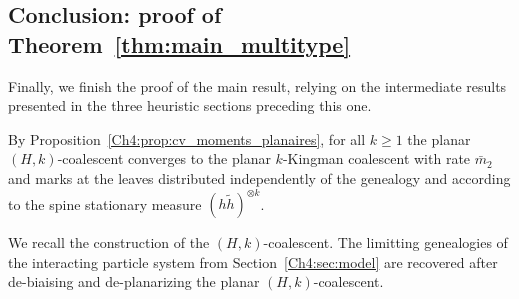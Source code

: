 \begin{refsegment}
\subsection{Conclusion: proof of Theorem~\ref{thm:main_multitype}}\label{Ch4:sec:debiaising}
Finally, we finish the proof of the main result, relying on the intermediate results presented in the three heuristic sections preceding this one.

\medskip

By Proposition~\ref{Ch4:prop:cv_moments_planaires}, for all $k\geq 1$ the planar $(H,k)$-coalescent converges to the planar $k$-Kingman coalescent with rate $\bar{m}_2$ and marks at the leaves distributed independently of the genealogy and according to the spine stationary measure $(h\tilde h)^{\otimes k}$. 


We recall the construction of the $(H,k)$-coalescent.
The limitting genealogies of the interacting particle system from Section~\ref{Ch4:sec:model} are recovered after de-biaising and de-planarizing the planar $(H,k)$-coalescent. 


\end{refsegment}
